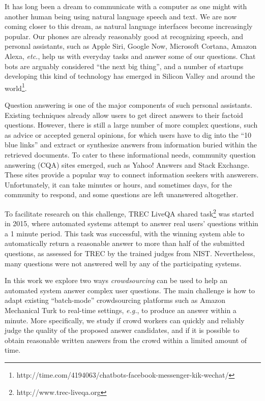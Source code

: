 It has long been a dream to communicate with a computer as one might with another human being using natural language speech and text.
We are now coming closer to this dream, as natural language interfaces become increasingly popular.
Our phones are already reasonably good at recognizing speech, and personal assistants, such as Apple Siri, Google Now, Microsoft Cortana, Amazon Alexa, \textit{etc.}, help us with everyday tasks and answer some of our questions.
Chat bots are arguably considered ``the next big thing'', and a number of startups developing this kind of technology has emerged in Silicon Valley and around the world\footnote{http://time.com/4194063/chatbots-facebook-messenger-kik-wechat/}.

Question answering is one of the major components of such personal assistants.
Existing techniques already allow users to get direct answers to their factoid questions.
However, there is still a large number of more complex questions, such as advice or accepted general opinions, for which users have to dig into the ``10 blue links'' and extract or synthesize answers from information buried within the retrieved documents.
To cater to these informational needs, community question answering (CQA) sites emerged, such as Yahoo! Answers and Stack Exchange.
These sites provide a popular way to connect information seekers with answerers.
Unfortunately, it can take minutes or hours, and sometimes days, for the community to respond, and some questions are left unanswered altogether. 

To facilitate research on this challenge, TREC LiveQA shared task\footnote{http://www.trec-liveqa.org} was started in 2015, where automated systems attempt to answer real users' questions within a 1 minute period.
This task was successful, with the winning system able to automatically return a reasonable answer to more than half of the submitted questions, as assessed for TREC by the trained judges from NIST.
Nevertheless, many questions were not answered well by any of the participating systems.

In this work we explore two ways \textit{crowdsourcing} can be used to help an automated system answer complex user questions.
The main challenge is how to adapt existing ``batch-mode'' crowdsourcing platforms such as Amazon Mechanical Turk to real-time settings, \textit{e.g.}, to produce an answer within a minute.
More specifically, we study if crowd workers can quickly and reliably judge the quality of the proposed answer candidates, and if it is possible to obtain reasonable written answers from the crowd within a limited amount of time.

